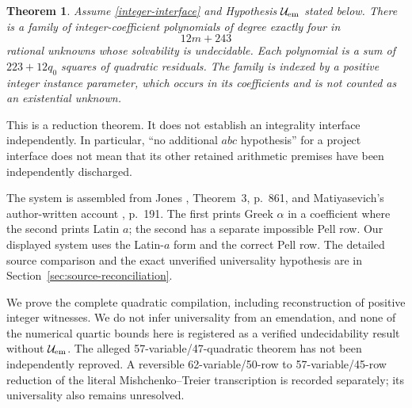 \documentclass[11pt]{article}
\newtheorem{theorem}{Theorem}
\begin{document}
\begin{theorem}\label{main}
Assume \eqref{integer-interface} and Hypothesis $\mathcal U_{\rm em}$
stated below. There is a family of integer-coefficient
polynomials of degree exactly four in
\[
 \boxed{12m+243}
\]
rational unknowns whose solvability is undecidable. Each polynomial is a
sum of \(223+12q_0\) squares of quadratic residuals. The family is indexed
by a positive integer instance parameter, which occurs in its
coefficients and is not counted as an existential unknown.
\end{theorem}

This is a reduction theorem. It does not establish an integrality
interface independently. In particular, ``no additional \(abc\)
hypothesis'' for a project interface does not mean that its other retained
arithmetic premises have been independently discharged.

The system is assembled from Jones \cite{Jones80}, Theorem~3,
p.~861, and Matiyasevich's author-written account \cite{Mat99}, p.~191.
The first prints Greek $\alpha$ in a coefficient where the second prints
Latin $a$; the second has a separate impossible Pell row. Our displayed
system uses the Latin-$a$ form and the correct Pell row. The detailed
source comparison and the exact unverified universality hypothesis are
in Section~\ref{sec:source-reconciliation}.

We prove the complete quadratic compilation, including reconstruction of
positive integer witnesses. We do not infer universality from an
emendation, and none of the numerical quartic bounds here is registered
as a verified undecidability result without $\mathcal U_{\rm em}$.
The alleged 57-variable/47-quadratic theorem has not been independently
reproved. A reversible 62-variable/50-row to 57-variable/45-row reduction
of the literal Mishchenko--Treier transcription is recorded separately;
its universality also remains unresolved.
\end{document}
